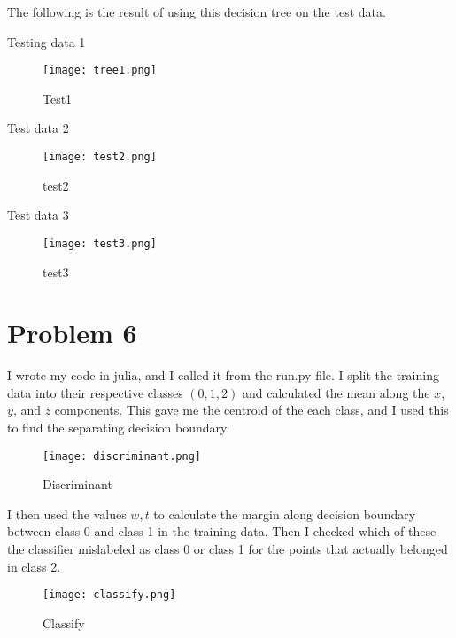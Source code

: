 The following is the result of using this decision tree on the test data.

Testing data 1

\begin{figure}[H]
  \centering
  \texttt{[image: tree1.png]}
  \caption{Test1}%
  \label{fig:test1}
\end{figure}

Test data 2

\begin{figure}[H]
  \centering
  \texttt{[image: test2.png]}
  \caption{test2}%
  \label{fig:test2}
\end{figure}

Test data 3

\begin{figure}[H]
  \centering
  \texttt{[image: test3.png]}
  \caption{test3}%
  \label{fig:test3}
\end{figure}

\section{Problem 6}%

I wrote my code in julia, and I called it from the run.py file. I split the
training data into their respective classes $(0, 1, 2)$ and calculated the mean
along the $x$,  $y$, and $z$ components. This gave me the centroid of the each
class, and I used this to find the separating decision boundary.

\begin{figure}[H]
  \centering
  \texttt{[image: discriminant.png]}
  \caption{Discriminant}%
  \label{fig:discriminant}
\end{figure}

I then used the values $w, t$ to calculate the margin along decision boundary
between class 0 and class 1 in the training data. Then I checked which of these
the classifier mislabeled as class 0 or class 1 for the points that actually
belonged in class 2. 

\begin{figure}[H]
  \centering
  \texttt{[image: classify.png]}
  \caption{Classify}%
  \label{fig:classify}
\end{figure}
